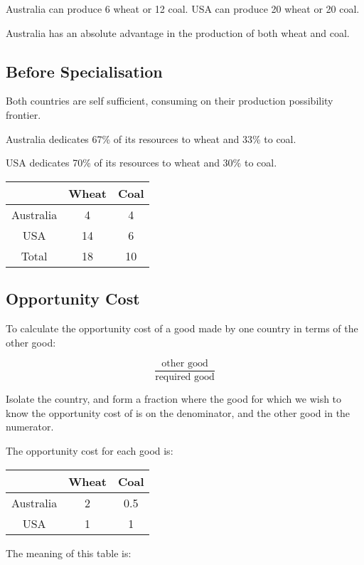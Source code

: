 \documentclass[a4paper,11pt]{article}
\begin{document}
Australia can produce 6 wheat or 12 coal. USA can produce 20 wheat or 20 coal.

Australia has an absolute advantage in the production of both wheat and coal.


\subsection{Before Specialisation}

Both countries are self sufficient, consuming on their production possibility
frontier.

Australia dedicates 67\% of its resources to wheat and 33\% to coal.

USA dedicates 70\% of its resources to wheat and 30\% to coal.

\begin{center}
\begin{tabular}{c|c|c}
& Wheat & Coal \\
\hline
Australia & 4  & 4  \\
USA       & 14 & 6  \\
Total     & 18 & 10 \\
\end{tabular}
\end{center}


\subsection{Opportunity Cost}

To calculate the opportunity cost of a good made by one country in terms of the
other good:

$$
\frac{\text{other good}}{\text{required good}}
$$

Isolate the country, and form a fraction where the good for which we wish to
know the opportunity cost of is on the denominator, and the other good in the
numerator.

The opportunity cost for each good is:

\begin{center}
\begin{tabular}{c|c|c}
& Wheat & Coal \\
\hline
Australia & 2 & 0.5 \\
USA       & 1 & 1   \\
\end{tabular}
\end{center}

The meaning of this table is:
\end{document}
